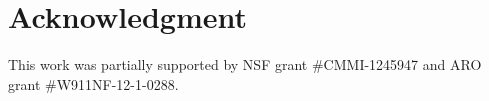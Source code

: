 \documentclass[%
 reprint,
nofootinbib,
nobibnotes,
 amsmath,amssymb,
]{revtex4-1}
\begin{document}














\section*{Acknowledgment}
This work was partially supported by NSF grant \#CMMI-1245947 and ARO
grant \#W911NF-12-1-0288.






\end{document}
